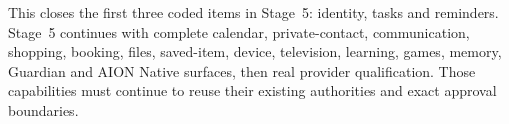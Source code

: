 This closes the first three coded items in Stage~5: identity, tasks and reminders.  Stage~5
continues with complete calendar, private-contact, communication, shopping, booking, files,
saved-item, device, television, learning, games, memory, Guardian and AION Native surfaces, then real provider
qualification.  Those capabilities must continue to reuse their existing authorities and exact
approval boundaries.
